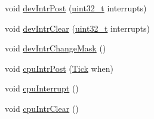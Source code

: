 \begin{DoxyCompactItemize}
\item 
void \hyperlink{classNSGigE_ad1a6ea4f31e657c02d56bdf168fb988a}{devIntrPost} (\hyperlink{Type_8hh_a435d1572bf3f880d55459d9805097f62}{uint32\_\-t} interrupts)
\item 
void \hyperlink{classNSGigE_a4515fb1f38bb5bd3676748aa187c286d}{devIntrClear} (\hyperlink{Type_8hh_a435d1572bf3f880d55459d9805097f62}{uint32\_\-t} interrupts)
\item 
void \hyperlink{classNSGigE_a6569a466e6023e4105fdbebe7e7088a3}{devIntrChangeMask} ()
\item 
void \hyperlink{classNSGigE_af1fc872917f4ac5efa0d55c5c139bc9a}{cpuIntrPost} (\hyperlink{base_2types_8hh_a5c8ed81b7d238c9083e1037ba6d61643}{Tick} when)
\item 
void \hyperlink{classNSGigE_a6191ac616bb71f81aeb9a72898f5207f}{cpuInterrupt} ()
\item 
void \hyperlink{classNSGigE_ab1873826f52c78bed89f2ee53382a4c2}{cpuIntrClear} ()
\end{DoxyCompactItemize}
